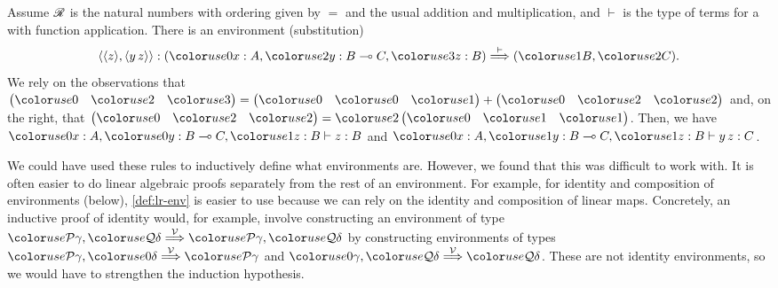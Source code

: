
\begin{example}
  Assume $\mathscr R$ is the natural numbers with ordering given by $=$ and
  the usual addition and multiplication, and $\vdash$ is the type of
  terms for a  with function application.  There is
  an environment (substitution)
  \[
    \alr{\alr{z},\alr{y\,z}} :
    \plr{\gr0x : A, \gr2y : B \multimap C, \gr3z : B} \env\vdash
    \plr{\gr1B, \gr2C}.
  \]
  We rely on the observations that
  $\begin{pmatrix} \gr0 & \gr2 & \gr3 \end{pmatrix} =
  \begin{pmatrix} \gr0 & \gr0 & \gr1 \end{pmatrix}
  + \begin{pmatrix} \gr0 & \gr2 & \gr2 \end{pmatrix}$ and, on the right, that
  $\begin{pmatrix} \gr0 & \gr2 & \gr2 \end{pmatrix} =
  \gr2\begin{pmatrix} \gr0 & \gr1 & \gr1 \end{pmatrix}$.
  Then, we have $\gr0x : A, \gr0y : B \multimap C, \gr1z : B \vdash z : B$ and
  $\gr0x : A, \gr1y : B \multimap C, \gr1z : B \vdash y\,z : C$.
\end{example}

We could have used these rules to inductively define what environments are.
However, we found that this was difficult to work with. It is often easier to do
linear algebraic proofs separately from the rest of an environment.
For example, for identity and composition of environments (below), \cref{def:lr-env}
is easier to use because we can rely on the identity and composition of linear
maps.
Concretely, an inductive proof of identity would, for example, involve
constructing an environment of type
$\grP\gamma, \grQ\delta \env\V \grP\gamma, \grQ\delta$ by constructing
environments of types $\grP\gamma, \gr0\delta \env\V \grP\gamma$ and
$\gr0\gamma, \grQ\delta \env\V \grQ\delta$.
These are not identity environments, so we would have to strengthen the
induction hypothesis.


